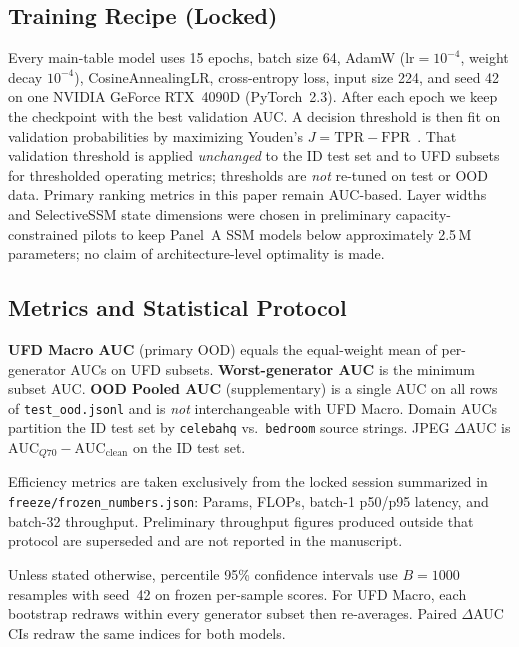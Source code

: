 \subsection{Training Recipe (Locked)}

Every main-table model uses 15 epochs, batch size 64, AdamW ($\mathrm{lr}=10^{-4}$, weight decay $10^{-4}$), CosineAnnealingLR, cross-entropy loss, input size 224, and seed 42 on one NVIDIA GeForce RTX~4090D (PyTorch~2.3).
After each epoch we keep the checkpoint with the best validation AUC.
A decision threshold is then fit on validation probabilities by maximizing Youden's $J=\mathrm{TPR}-\mathrm{FPR}$~\cite{youden1950}.
That validation threshold is applied \emph{unchanged} to the ID test set and to UFD subsets for thresholded operating metrics; thresholds are \emph{not} re-tuned on test or OOD data.
Primary ranking metrics in this paper remain AUC-based.
Layer widths and SelectiveSSM state dimensions were chosen in preliminary capacity-constrained pilots to keep Panel~A SSM models below approximately 2.5\,M parameters; no claim of architecture-level optimality is made.

\subsection{Metrics and Statistical Protocol}
\label{sec:metrics}

\textbf{UFD Macro AUC} (primary OOD) equals the equal-weight mean of per-generator AUCs on UFD subsets.
\textbf{Worst-generator AUC} is the minimum subset AUC.
\textbf{OOD Pooled AUC} (supplementary) is a single AUC on all rows of \texttt{test\_ood.jsonl} and is \emph{not} interchangeable with UFD Macro.
Domain AUCs partition the ID test set by \texttt{celebahq} vs.\ \texttt{bedroom} source strings.
JPEG $\Delta$AUC is $\mathrm{AUC}_{Q70}-\mathrm{AUC}_{\mathrm{clean}}$ on the ID test set.

Efficiency metrics are taken exclusively from the locked session summarized in \texttt{freeze/frozen\_numbers.json}: Params, FLOPs, batch-1 p50/p95 latency, and batch-32 throughput.
Preliminary throughput figures produced outside that protocol are superseded and are not reported in the manuscript.

Unless stated otherwise, percentile 95\% confidence intervals use $B=1000$ resamples with seed~42 on frozen per-sample scores.
For UFD Macro, each bootstrap redraws within every generator subset then re-averages.
Paired $\Delta$AUC CIs redraw the same indices for both models.

